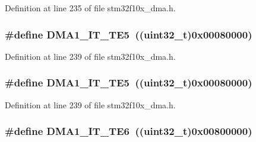Definition at line 235 of file stm32f10x\+\_\+dma.\+h.

\subsubsection[{\texorpdfstring{D\+M\+A1\+\_\+\+I\+T\+\_\+\+T\+E5}{DMA1_IT_TE5}}]{\setlength{\rightskip}{0pt plus 5cm}\#define D\+M\+A1\+\_\+\+I\+T\+\_\+\+T\+E5~(({\bf uint32\+\_\+t})0x00080000)}\hypertarget{group___d_m_a__interrupts__definition_ga7c1f1a465bd0e9755e5fbf2cd7054528}{}\label{group___d_m_a__interrupts__definition_ga7c1f1a465bd0e9755e5fbf2cd7054528}


Definition at line 239 of file stm32f10x\+\_\+dma.\+h.

\subsubsection[{\texorpdfstring{D\+M\+A1\+\_\+\+I\+T\+\_\+\+T\+E5}{DMA1_IT_TE5}}]{\setlength{\rightskip}{0pt plus 5cm}\#define D\+M\+A1\+\_\+\+I\+T\+\_\+\+T\+E5~(({\bf uint32\+\_\+t})0x00080000)}\hypertarget{group___d_m_a__interrupts__definition_ga7c1f1a465bd0e9755e5fbf2cd7054528}{}\label{group___d_m_a__interrupts__definition_ga7c1f1a465bd0e9755e5fbf2cd7054528}


Definition at line 239 of file stm32f10x\+\_\+dma.\+h.

\subsubsection[{\texorpdfstring{D\+M\+A1\+\_\+\+I\+T\+\_\+\+T\+E6}{DMA1_IT_TE6}}]{\setlength{\rightskip}{0pt plus 5cm}\#define D\+M\+A1\+\_\+\+I\+T\+\_\+\+T\+E6~(({\bf uint32\+\_\+t})0x00800000)}\hypertarget{group___d_m_a__interrupts__definition_ga2bbf515c1154a5ad359cbd0ace724e64}{}\label{group___d_m_a__interrupts__definition_ga2bbf515c1154a5ad359cbd0ace724e64}


